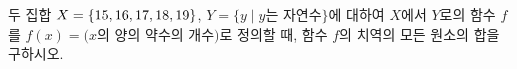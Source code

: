 두 집합 $X=\{15{,}\mkern3mu\mathopen{}16{,}\mkern3mu\mathopen{}17{,}\mkern3mu\mathopen{}18{,}\mkern3mu\mathopen{}19\}$, $Y=\{y \mid y$는 자연수$\}$에 대하여 $X$에서 $Y$로의 함수 $f$를 $f(x)=(x$의 양의 약수의 개수$)$로 정의할 때, 함수 $f$의 치역의 모든 원소의 합을 구하시오.
